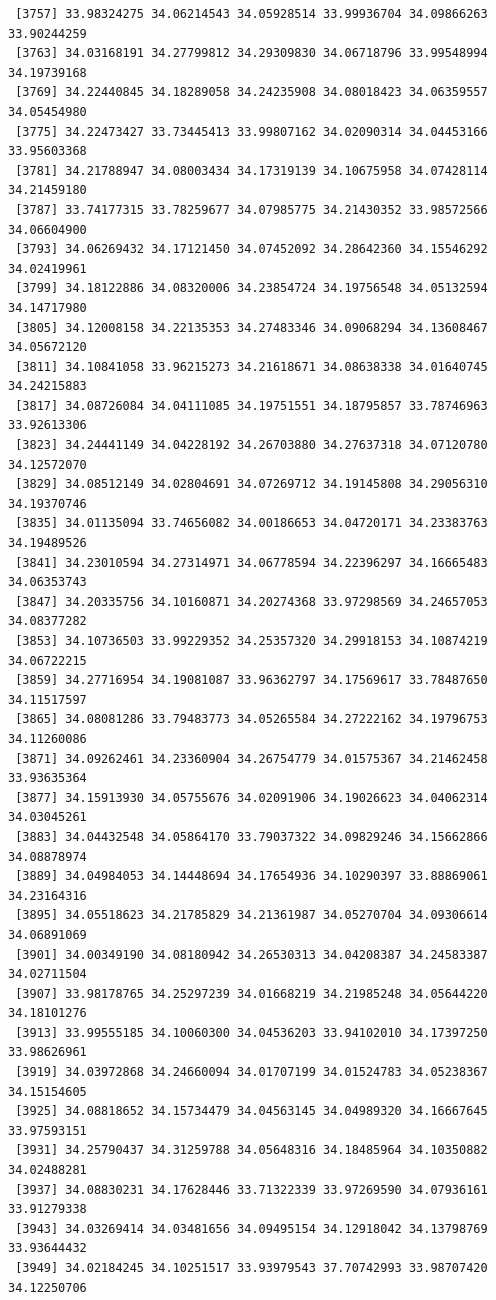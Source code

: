 \documentclass[
  letterpaper,
  DIV=11,
  numbers=noendperiod]{scrartcl}
\begin{document}
\begin{verbatim}
 [3757] 33.98324275 34.06214543 34.05928514 33.99936704 34.09866263 33.90244259
 [3763] 34.03168191 34.27799812 34.29309830 34.06718796 33.99548994 34.19739168
 [3769] 34.22440845 34.18289058 34.24235908 34.08018423 34.06359557 34.05454980
 [3775] 34.22473427 33.73445413 33.99807162 34.02090314 34.04453166 33.95603368
 [3781] 34.21788947 34.08003434 34.17319139 34.10675958 34.07428114 34.21459180
 [3787] 33.74177315 33.78259677 34.07985775 34.21430352 33.98572566 34.06604900
 [3793] 34.06269432 34.17121450 34.07452092 34.28642360 34.15546292 34.02419961
 [3799] 34.18122886 34.08320006 34.23854724 34.19756548 34.05132594 34.14717980
 [3805] 34.12008158 34.22135353 34.27483346 34.09068294 34.13608467 34.05672120
 [3811] 34.10841058 33.96215273 34.21618671 34.08638338 34.01640745 34.24215883
 [3817] 34.08726084 34.04111085 34.19751551 34.18795857 33.78746963 33.92613306
 [3823] 34.24441149 34.04228192 34.26703880 34.27637318 34.07120780 34.12572070
 [3829] 34.08512149 34.02804691 34.07269712 34.19145808 34.29056310 34.19370746
 [3835] 34.01135094 33.74656082 34.00186653 34.04720171 34.23383763 34.19489526
 [3841] 34.23010594 34.27314971 34.06778594 34.22396297 34.16665483 34.06353743
 [3847] 34.20335756 34.10160871 34.20274368 33.97298569 34.24657053 34.08377282
 [3853] 34.10736503 33.99229352 34.25357320 34.29918153 34.10874219 34.06722215
 [3859] 34.27716954 34.19081087 33.96362797 34.17569617 33.78487650 34.11517597
 [3865] 34.08081286 33.79483773 34.05265584 34.27222162 34.19796753 34.11260086
 [3871] 34.09262461 34.23360904 34.26754779 34.01575367 34.21462458 33.93635364
 [3877] 34.15913930 34.05755676 34.02091906 34.19026623 34.04062314 34.03045261
 [3883] 34.04432548 34.05864170 33.79037322 34.09829246 34.15662866 34.08878974
 [3889] 34.04984053 34.14448694 34.17654936 34.10290397 33.88869061 34.23164316
 [3895] 34.05518623 34.21785829 34.21361987 34.05270704 34.09306614 34.06891069
 [3901] 34.00349190 34.08180942 34.26530313 34.04208387 34.24583387 34.02711504
 [3907] 33.98178765 34.25297239 34.01668219 34.21985248 34.05644220 34.18101276
 [3913] 33.99555185 34.10060300 34.04536203 33.94102010 34.17397250 33.98626961
 [3919] 34.03972868 34.24660094 34.01707199 34.01524783 34.05238367 34.15154605
 [3925] 34.08818652 34.15734479 34.04563145 34.04989320 34.16667645 33.97593151
 [3931] 34.25790437 34.31259788 34.05648316 34.18485964 34.10350882 34.02488281
 [3937] 34.08830231 34.17628446 33.71322339 33.97269590 34.07936161 33.91279338
 [3943] 34.03269414 34.03481656 34.09495154 34.12918042 34.13798769 33.93644432
 [3949] 34.02184245 34.10251517 33.93979543 37.70742993 33.98707420 34.12250706

\end{verbatim}
\end{document}
